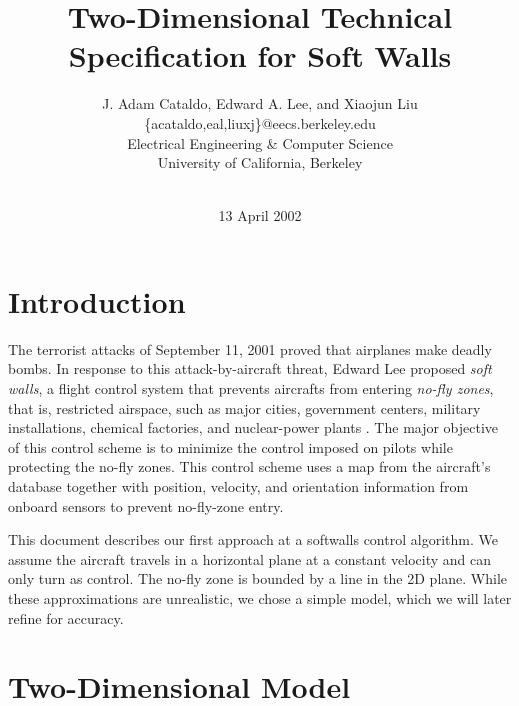 \documentclass[11pt]{article}
\begin{document}


\title{Two-Dimensional Technical Specification for Soft Walls}
\author{J. Adam Cataldo, Edward A. Lee, and
Xiaojun Liu\\ \{acataldo,eal,liuxj\}@eecs.berkeley.edu\\ Electrical
Engineering \& Computer Science\\ University of California, Berkeley\\
\\} 
\date{13 April 2002}

\maketitle


\section{Introduction}

The terrorist attacks of September 11, 2001 proved that airplanes make
deadly bombs.  In response to this attack-by-aircraft threat, Edward
Lee proposed \textit{soft walls}, a flight control system that
prevents aircrafts from entering \textit{no-fly zones}, that is,
restricted airspace, such as major cities, government centers,
military installations, chemical factories, and nuclear-power plants
\cite{Lee}.  The major objective of this control scheme is to minimize
the control imposed on pilots while protecting the no-fly zones.  This
control scheme uses a map from the aircraft's database together with
position, velocity, and orientation information from onboard sensors
to prevent no-fly-zone entry.

This document describes our first approach at a softwalls control
algorithm.  We assume the aircraft travels in a horizontal plane at a
constant velocity and can only turn as control.  The no-fly zone is
bounded by a line in the 2D plane.  While these approximations are
unrealistic, we chose a simple model, which we will later refine for
accuracy.



\section{Two-Dimensional Model}
\end{document}
